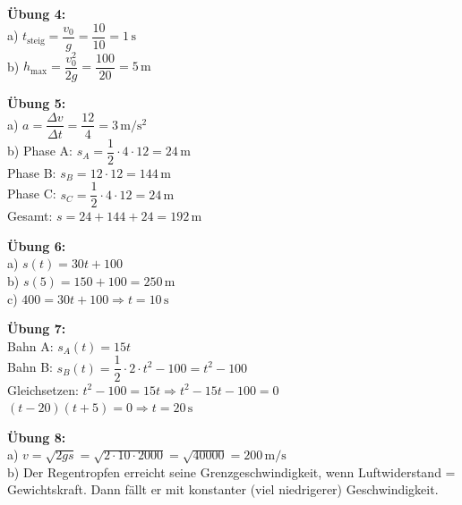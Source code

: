 \documentclass[11pt,a4paper]{article}
\begin{document}
\vspace{0.3cm}

\noindent\textbf{Übung 4:}\\
a) $t_{\text{steig}} = \dfrac{v_0}{g} = \dfrac{10}{10} = 1\,\mathrm{s}$\\
b) $h_{\text{max}} = \dfrac{v_0^2}{2g} = \dfrac{100}{20} = 5\,\mathrm{m}$

\vspace{0.3cm}

\noindent\textbf{Übung 5:}\\
a) $a = \dfrac{\Delta v}{\Delta t} = \dfrac{12}{4} = 3\,\mathrm{m/s^2}$\\
b) Phase A: $s_A = \dfrac{1}{2} \cdot 4 \cdot 12 = 24\,\mathrm{m}$\\
\phantom{b)} Phase B: $s_B = 12 \cdot 12 = 144\,\mathrm{m}$\\
\phantom{b)} Phase C: $s_C = \dfrac{1}{2} \cdot 4 \cdot 12 = 24\,\mathrm{m}$\\
\phantom{b)} Gesamt: $s = 24 + 144 + 24 = 192\,\mathrm{m}$

\vspace{0.3cm}

\noindent\textbf{Übung 6:}\\
a) $s(t) = 30t + 100$\\
b) $s(5) = 150 + 100 = 250\,\mathrm{m}$\\
c) $400 = 30t + 100 \Rightarrow t = 10\,\mathrm{s}$

\vspace{0.3cm}

\noindent\textbf{Übung 7:}\\
Bahn A: $s_A(t) = 15t$\\
Bahn B: $s_B(t) = \dfrac{1}{2} \cdot 2 \cdot t^2 - 100 = t^2 - 100$\\
Gleichsetzen: $t^2 - 100 = 15t \Rightarrow t^2 - 15t - 100 = 0$\\
$(t-20)(t+5) = 0 \Rightarrow t = 20\,\mathrm{s}$

\vspace{0.3cm}

\noindent\textbf{Übung 8:}\\
a) $v = \sqrt{2gs} = \sqrt{2 \cdot 10 \cdot 2000} = \sqrt{40000} = 200\,\mathrm{m/s}$\\
b) Der Regentropfen erreicht seine Grenzgeschwindigkeit, wenn Luftwiderstand = Gewichtskraft. Dann fällt er mit konstanter (viel niedrigerer) Geschwindigkeit.

\newpage

\end{document}
